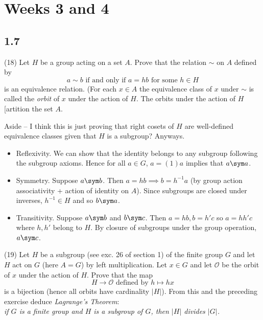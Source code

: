 \documentclass[1    0pt, answers]{exam} \renewcommand{\baselinestretch}{1.05}
\theoremstyle{plain}
\theoremstyle{definition}
\begin{document}
\section{Weeks 3 and 4}
\begin{questions}

\subsection{1.7}

\question (18) Let $H$ be a group acting on a set $A$. Prove that the relation $\sim$ on $A$ defined by \[ a \sim b \text{ if and only if } a = hb \text{ for some } h \in H \] is an equivalence relation. (For each $x \in A$ the equivalence class of $x$ under $\sim$ is called the \emph{orbit} of $x$ under the action of $H$. The orbits under the action of $H$ [artition the set $A$. 

\begin{solution}
Aside -- I think this is just proving that right cosets of $H$ are well-defined equivalence classes given that $H$ is a subgroup? Anyways.
\begin{itemize}
\item Reflexivity. We can show that the identity belongs to any subgroup following the subgroup axioms. Hence for all $a \in G$, $a = (1)a$ implies that $a \sym a$.
\item Symmetry. Suppose $a \sym b$. Then $a = hb \implies b = h^{-1}a$ (by group action associativity + action of identity on $A$). Since subgroups are closed under inverses, $h^{-1} \in H$ and so $b \sym a$.
\item Transitivity. Suppose $a \sym b$ and $b \sym c$. Then $a = hb, b = h'c$ so $a = hh'c$ where $h, h'$ belong to $H$. By closure of subgroups under the group operation, $a \sym c$.
\end{itemize}
\end{solution}

\question (19) Let $H$ be a subgroup (see exc. 26 of section 1) of the finite group $G$ and let $H$ act on $G$ (here $A = G$) by left multiplication. Let $x \in G$ and let $\mathcal{O}$ be the orbit of $x$ under the action of $H$. Prove that the map \[ H \to \mathcal{O} \text{ defined by } h \mapsto h x \] is a bijection (hence all orbits have cardinality $|H|$). From this and the preceding exercise deduce \emph{Lagrange's Theorem}: \\
\emph{if $G$ is a finite group and $H$ is a subgroup of $G$, then $|H|$ divides $|G|$.}


\end{questions}
\end{document}
